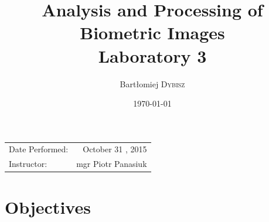 \documentclass{article}
\title{Analysis and Processing of Biometric Images \\ Laboratory 3} %
\author{Bartłomiej \textsc{Dybisz}} %
\date{\today} %
\begin{document}
\maketitle %

\begin{center}
\begin{tabular}{l r}
Date Performed: & October 31 , 2015 \\ %
Instructor: & mgr Piotr Panasiuk %
\end{tabular}
\end{center}



\section{Objectives}
\end{document}
